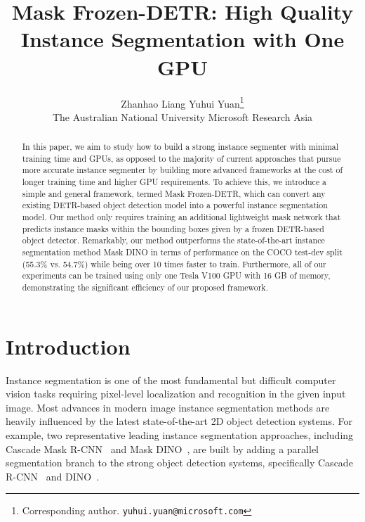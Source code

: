\documentclass[10pt,twocolumn,letterpaper]{article}
\begin{document}
\title{Mask Frozen-DETR: High Quality Instance Segmentation with One GPU}



\author{
  Zhanhao Liang \quad\quad\quad\quad\quad\quad\quad\quad\quad Yuhui Yuan\thanks{Corresponding author. \Letter\space \texttt{yuhui.yuan@microsoft.com}} \\
  The Australian National University\quad\quad\quad
  Microsoft Research Asia \\
}

\maketitle

\begin{abstract}
In this paper, we aim to study how to build a strong instance segmenter with minimal training time and GPUs, as opposed to the majority of current approaches that pursue more accurate instance segmenter by building more advanced frameworks at the cost of longer training time and higher GPU requirements. To achieve this, we introduce a simple and general framework, termed Mask Frozen-DETR, which can convert any existing DETR-based object detection model into a powerful instance segmentation model. Our method only requires training an additional lightweight mask network that predicts instance masks within the bounding boxes given by a frozen DETR-based object detector. Remarkably, our method outperforms the state-of-the-art instance segmentation method Mask DINO in terms of performance on the COCO test-dev split (55.3\% vs. 54.7\%) while being over 10 times faster to train. Furthermore, all of our experiments can be trained using only one Tesla V100 GPU with 16 GB of memory, demonstrating the significant efficiency of our proposed framework.
\end{abstract}


\section{Introduction}

Instance segmentation is one of the most fundamental but difficult computer vision tasks requiring pixel-level localization and recognition in the given input image. Most advances in modern image instance segmentation methods are heavily influenced by the latest state-of-the-art 2D object detection systems. For example, two representative leading instance segmentation approaches, including Cascade Mask R-CNN~\cite{cai2019cascade} and Mask DINO~\cite{li2022mask}, are built by adding a parallel segmentation branch to the strong object detection systems, specifically Cascade R-CNN~\cite{cai2018cascade} and DINO~\cite{zhang2022dino}.
\end{document}
